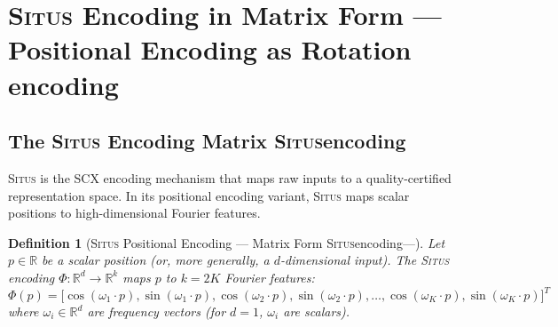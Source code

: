 \documentclass[12pt,a4paper]{article}
\newtheorem{definition}[theorem]{Definition}
\theoremstyle{definition}
\newcommand{\Situs}{\textsc{Situs}}
\newcommand{\SCX}{\textsc{SCX}}
\newcommand{\R}{\mathbb{R}}
\begin{document}
\section{\Situs{} Encoding in Matrix Form — Positional Encoding as Rotation encoding}
\label{sec:situs_matrix}

\subsection{The \Situs{} Encoding Matrix \Situs{}encoding}

\Situs{} is the \SCX{} encoding mechanism that maps raw inputs to a quality-certified 
representation space. In its positional encoding variant, \Situs{} maps scalar positions 
to high-dimensional Fourier features.

\begin{definition}[\Situs{} Positional Encoding — Matrix Form \Situs{}encoding---]\label{def:situs_encoding}
Let $p \in \R$ be a scalar position (or, more generally, a $d$-dimensional input).
The \Situs{} encoding $\Phi: \R^d \to \R^k$ maps $p$ to $k = 2K$ Fourier features:
\begin{equation}\label{eq:situs_fourier}
    \Phi(p) = \bigl[\cos(\omega_1 \cdot p), \sin(\omega_1 \cdot p), \cos(\omega_2 \cdot p), \sin(\omega_2 \cdot p), \ldots, \cos(\omega_K \cdot p), \sin(\omega_K \cdot p)\bigr]^T
\end{equation}
where $\omega_i \in \R^d$ are frequency vectors (for $d=1$, $\omega_i$ are scalars).
\end{definition}
\end{document}
